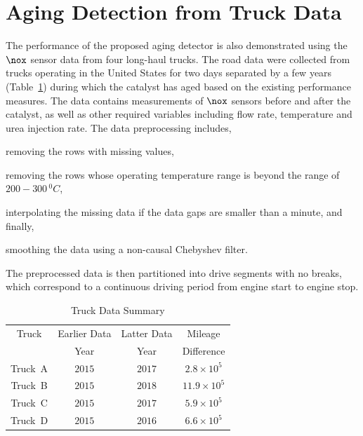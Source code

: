 \section{Aging Detection from Truck Data}
The performance of the proposed aging detector is also demonstrated using the $\nox$ sensor data from four long-haul
trucks. The road data were collected from trucks operating in the United States for two days separated by a few years
(Table~\ref{tab::truck_data_summary}) during which the catalyst has aged based on the existing performance measures. The
data contains measurements of $\nox$ sensors before and after the catalyst, as well as other required variables
including flow rate, temperature and urea injection rate. The data preprocessing includes,
\begin{inparaenum}
        \item removing the rows with missing values,
        \item removing the rows whose operating temperature range is beyond the range of $200-300 \,^0C$,
        \item interpolating the missing data if the data gaps are smaller than a minute, and finally,
        \item smoothing the data using a non-causal Chebyshev filter.
\end{inparaenum}
The preprocessed data is then partitioned into drive segments with no breaks, which correspond to a continuous driving
period from engine start to engine stop.
\begin{table}[ht]
        \centering
        \caption{Truck Data Summary}
        \label{tab::truck_data_summary}
        \begin{tabular}{c c c c}
        \hline \hline
         Truck & Earlier Data & Latter Data & Mileage \\
               &  Year            & Year    & Difference\\ \hline \hline
        Truck~A & $2015$ & $2017$ & $2.8 \times 10^5$\\
        Truck~B & $2015$ & $2018$ & $11.9 \times 10^5$\\
        Truck~C & $2015$ & $2017$ & $5.9 \times 10^5$\\
        Truck~D & $2015$ & $2016$ & $6.6 \times 10^5$ \\
        \hline \hline
        \end{tabular}
\end{table}

